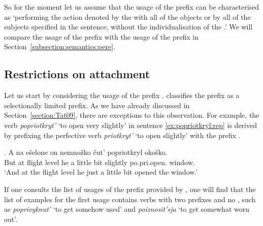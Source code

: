 So for the moment let us assume that the  usage of the prefix  can be characterised as `performing the action denoted by the  with all of the objects or by all of the subjects specified in the sentence, without the individualisation of the .' We will compare the  usage of the prefix  with the  usage of the prefix  in Section~\ref{subsection:semantics:pere}.

\subsection{Restrictions on attachment} 
Let us start by considering the  usage of the prefix . \citet{Tatevosov:09} classifies the  prefix  as a selectionally limited prefix. As we have already discussed in Section~\ref{section:Tat09}, there are exceptions to this observation. For example, the verb \textit{popriotkryt'} `to open very slightly' in sentence \ref{ex:popriotkryl:rep} is derived by prefixing the perfective verb \textit{priotkryt'} `to open slightly' with the  prefix .

\exg. \label{ex:popriotkryl:rep}A na e\v{s}elone on nemno\v{z}ko \v{c}ut' popriotkryl oko\v{s}ko.\\
But at {flight level} he {a little bit} {slightly} po.pri.open. window.\\
\trans `And at the flight level he just a little bit opened the window.'\\

If one consults the list of usages of the prefix  provided by \citet{Shvedova:82}, one will find that the list of examples for the first usage contains verbs with two prefixes and no , such as \textit{poprivyknut'} `to get somehow used' and \textit{poiznosit'sja} `to get somewhat worn out'. 


